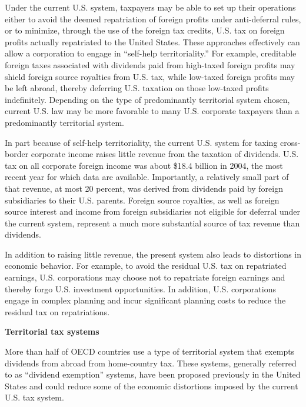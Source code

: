\begin{select}
Under the current U.S. system, taxpayers may be able to set up their operations 
either to avoid the deemed repatriation of foreign profits under anti-deferral rules, or to 
minimize, through the use of the foreign tax credits, U.S. tax on foreign profits actually 
repatriated to the United States.  These approaches effectively can allow a corporation to 
engage in ``self-help territoriality.''  For example, creditable foreign taxes associated with 
dividends paid from high-taxed foreign profits may shield foreign source royalties from 
U.S. tax, while low-taxed foreign profits may be left abroad, thereby deferring U.S. 
taxation on those low-taxed profits indefinitely.  Depending on the type of predominantly 
territorial system chosen, current U.S. law may be more favorable to many U.S. corporate 
taxpayers than a predominantly territorial system. 
 
In part because of self-help territoriality, the current U.S. system for taxing cross-border corporate income raises little revenue from the taxation of dividends.  U.S. tax on 
all corporate foreign income was about \$18.4 billion in 2004, the most recent year for 
which data are available.  Importantly, a relatively small part of that revenue, at most 20 
percent, was derived from dividends paid by foreign subsidiaries to their U.S. parents.  
Foreign source royalties, as well as foreign source interest and income from foreign 
subsidiaries not eligible for deferral under the current system, represent a much more 
substantial source of tax revenue than dividends. 
 
In addition to raising little revenue, the present system also leads to distortions in 
economic behavior.  For example, to avoid the residual U.S. tax on repatriated earnings, 
U.S. corporations may choose not to repatriate foreign earnings and thereby forgo U.S. 
investment opportunities.  In addition, U.S. corporations engage in complex planning and 
incur significant planning costs to reduce the residual tax on repatriations.   
 
\begin{center}
\textbf{Territorial tax systems} 
\end{center}
 
More than half of OECD countries use a type of territorial system that exempts 
dividends from abroad from home-country tax.  These systems, generally referred to as 
``dividend exemption'' systems, have been proposed previously in the United States and 
could reduce some of the economic distortions imposed by the current U.S. tax system. 
   

\end{select}
